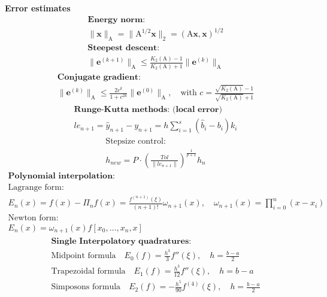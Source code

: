 \documentclass[10pt, a4paper]{article}
\begin{document}
\textbf{\Large Error estimates}
\begin{gather*}
    \textbf{Energy norm:} \\
    \|\mathbf{x}\|_\text{A} =  \|\text{A}^{1/2}\mathbf{x}\|_2 = (\text{A}\mathbf{x},\mathbf{x})^{1/2}
\end{gather*}
\begin{gather*}
    \textbf{Steepest descent:} \\
    \|\mathbf{e}^{(k+1)}\|_\text{A} \leq \frac{K_2(\text{A})-1}{K_2(\text{A})+1}\|\mathbf{e}^{(k)}\|_\text{A}
\end{gather*}
\begin{gather*}
    \textbf{Conjugate gradient:} \\
    \|\mathbf{e}^{(k)}\|_\text{A} \leq \frac{2c^k}{1+c^{2k}}\|\mathbf{e}^{(0)}\|_\text{A}, \quad
    \text{with } c = \frac{\sqrt{K_2(\text{A})}-1}{\sqrt{K_2(\text{A})}+1}
\end{gather*}
\begin{gather*}
    \textbf{Runge-Kutta methods: (local error)} \\
    le_{n+1} = \hat{y}_{n+1}-y_{n+1} = h\sum_{i=1}^s(\hat{b}_i-b_i)k_i
\end{gather*}
\begin{gather*}
    \text{Stepsize control:} \\
    h_{new} = P\cdot \left( \frac{Tol}{\|le_{n+1}\|} \right)^{\frac{1}{p+1}}h_n
\end{gather*}
\begin{gather*}
    \textbf{Polynomial interpolation:} \\
    \text{Lagrange form:} \\
    E_n(x) = f(x)- \Pi_nf(x) = \frac{f^{(n+1)}(\xi)}{(n+1)!}\omega_{n+1}(x), \quad
    \omega_{n+1}(x) = \prod_{i=0}^n(x-x_i) \\
    \text{Newton form:} \\
    E_n(x) = \omega_{n+1}(x)f[x_0,\dots,x_n,x]
\end{gather*}
\begin{gather*}
    \textbf{Single Interpolatory quadratures:} \\
    \text{Midpoint formula} \quad E_0(f) = \frac{h^3}{3}f''(\xi), \quad h = \frac{b-a}{2} \\
    \text{Trapezoidal formula} \quad E_1(f) = \frac{h^3}{12}f''(\xi), \quad h = b-a \\
    \text{Simposons formula} \quad E_2(f) = -\frac{h^5}{90}f^{(4)}(\xi), \quad h = \frac{b-a}{2} \\
\end{gather*}
\end{document}
